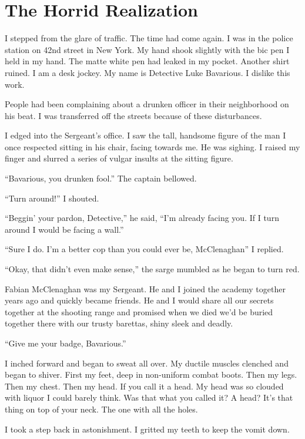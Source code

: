 \chapter{The Horrid Realization}



I stepped from the glare of traffic. The time had come again. I was
in the police station on 42nd street in New York. My hand shook
slightly with the bic pen I held in my hand. The matte white pen
had leaked in my pocket. Another shirt ruined. I am a desk jockey.
My name is Detective Luke Bavarious. I dislike this work.

People had been complaining about a drunken officer in their
neighborhood on his beat. I was transferred off the streets because
of these disturbances.

I edged into the Sergeant's office. I saw the tall, handsome figure
of the man I once respected sitting in his chair, facing towards
me. He was sighing. I raised my finger and slurred a series of
vulgar insults at the sitting figure.

``Bavarious, you drunken fool.'' The captain bellowed.

``Turn around!'' I shouted.

``Beggin' your pardon, Detective,'' he said, ``I'm already facing you.
If I turn around I would be facing a wall.''

``Sure I do. I'm a better cop than you could ever be, McClenaghan'' I
replied.

``Okay, that didn't even make sense,'' the sarge mumbled as he began
to turn red.

Fabian McClenaghan was my Sergeant. He and I joined the academy
together years ago and quickly became friends. He and I would share
all our secrets together at the shooting range and promised when we
died we'd be buried together there with our trusty barettas, shiny
sleek and deadly.

``Give me your badge, Bavarious.''

I inched forward and began to sweat all over. My ductile muscles
clenched and began to shiver. First my feet, deep in non-uniform
combat boots. Then my legs. Then my chest. Then my head. If you
call it a head. My head was so clouded with liquor I could barely
think. Was that what you called it? A head? It's that thing on top
of your neck. The one with all the holes.

I took a step back in astonishment. I gritted my teeth to keep the
vomit down.

